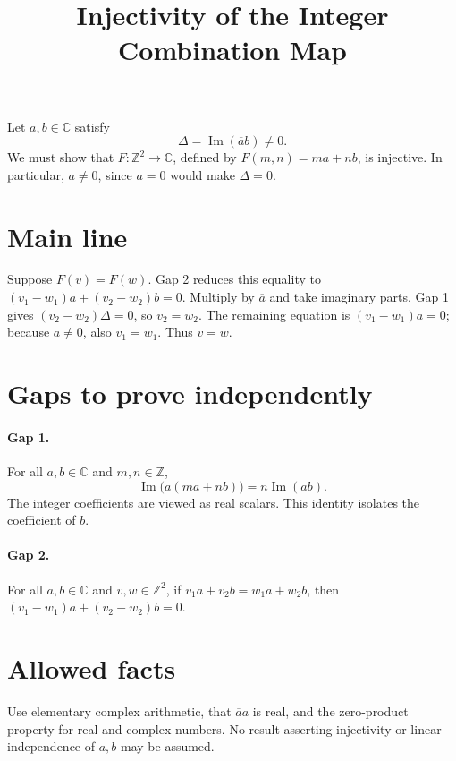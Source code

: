\documentclass[11pt]{article}
\title{Injectivity of the Integer Combination Map}
\author{}
\date{}
\begin{document}
\maketitle

Let $a,b\in\mathbb C$ satisfy
\[
  \Delta=\operatorname{Im}(\overline a b)\ne 0.
\]
We must show that $F:\mathbb Z^2\to\mathbb C$, defined by
$F(m,n)=ma+nb$, is injective. In particular, $a\ne0$, since
$a=0$ would make $\Delta=0$.

\section*{Main line}

Suppose $F(v)=F(w)$. Gap 2 reduces this equality to
$(v_1-w_1)a+(v_2-w_2)b=0$. Multiply by $\overline a$ and take
imaginary parts. Gap 1 gives $(v_2-w_2)\Delta=0$, so $v_2=w_2$.
The remaining equation is $(v_1-w_1)a=0$; because $a\ne0$, also
$v_1=w_1$. Thus $v=w$.

\section*{Gaps to prove independently}

\paragraph{Gap 1.}
For all $a,b\in\mathbb C$ and $m,n\in\mathbb Z$,
\[
  \operatorname{Im}\bigl(\overline a(ma+nb)\bigr)
  =n\operatorname{Im}(\overline a b).
\]
The integer coefficients are viewed as real scalars. This identity
isolates the coefficient of $b$.

\paragraph{Gap 2.}
For all $a,b\in\mathbb C$ and $v,w\in\mathbb Z^2$, if
$v_1a+v_2b=w_1a+w_2b$, then
$(v_1-w_1)a+(v_2-w_2)b=0$.

\section*{Allowed facts}

Use elementary complex arithmetic, that $\overline a a$ is real, and
the zero-product property for real and complex numbers. No result
asserting injectivity or linear independence of $a,b$ may be assumed.
\end{document}
